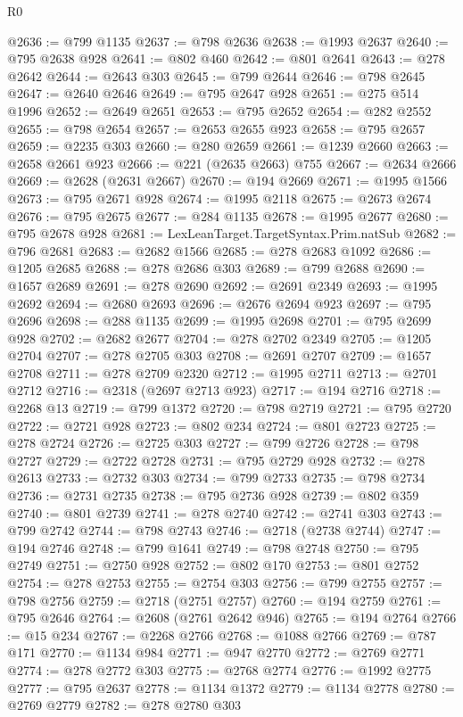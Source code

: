 \begin{lexlean}{R0}
\begin{coremodule}
@2636 := @799 @1135
@2637 := @798 @2636
@2638 := @1993 @2637
@2640 := @795 @2638 @928
@2641 := @802 @460
@2642 := @801 @2641
@2643 := @278 @2642
@2644 := @2643 @303
@2645 := @799 @2644
@2646 := @798 @2645
@2647 := @2640 @2646
@2649 := @795 @2647 @928
@2651 := @275 @514 @1996
@2652 := @2649 @2651
@2653 := @795 @2652
@2654 := @282 @2552
@2655 := @798 @2654
@2657 := @2653 @2655 @923
@2658 := @795 @2657
@2659 := @2235 @303
@2660 := @280 @2659
@2661 := @1239 @2660
@2663 := @2658 @2661 @923
@2666 := @221 (@2635 @2663) @755
@2667 := @2634 @2666
@2669 := @2628 (@2631 @2667)
@2670 := @194 @2669
@2671 := @1995 @1566
@2673 := @795 @2671 @928
@2674 := @1995 @2118
@2675 := @2673 @2674
@2676 := @795 @2675
@2677 := @284 @1135
@2678 := @1995 @2677
@2680 := @795 @2678 @928
@2681 := LexLeanTarget.TargetSyntax.Prim.natSub
@2682 := @796 @2681
@2683 := @2682 @1566
@2685 := @278 @2683 @1092
@2686 := @1205 @2685
@2688 := @278 @2686 @303
@2689 := @799 @2688
@2690 := @1657 @2689
@2691 := @278 @2690
@2692 := @2691 @2349
@2693 := @1995 @2692
@2694 := @2680 @2693
@2696 := @2676 @2694 @923
@2697 := @795 @2696
@2698 := @288 @1135
@2699 := @1995 @2698
@2701 := @795 @2699 @928
@2702 := @2682 @2677
@2704 := @278 @2702 @2349
@2705 := @1205 @2704
@2707 := @278 @2705 @303
@2708 := @2691 @2707
@2709 := @1657 @2708
@2711 := @278 @2709 @2320
@2712 := @1995 @2711
@2713 := @2701 @2712
@2716 := @2318 (@2697 @2713 @923)
@2717 := @194 @2716
@2718 := @2268 @13
@2719 := @799 @1372
@2720 := @798 @2719
@2721 := @795 @2720
@2722 := @2721 @928
@2723 := @802 @234
@2724 := @801 @2723
@2725 := @278 @2724
@2726 := @2725 @303
@2727 := @799 @2726
@2728 := @798 @2727
@2729 := @2722 @2728
@2731 := @795 @2729 @928
@2732 := @278 @2613
@2733 := @2732 @303
@2734 := @799 @2733
@2735 := @798 @2734
@2736 := @2731 @2735
@2738 := @795 @2736 @928
@2739 := @802 @359
@2740 := @801 @2739
@2741 := @278 @2740
@2742 := @2741 @303
@2743 := @799 @2742
@2744 := @798 @2743
@2746 := @2718 (@2738 @2744)
@2747 := @194 @2746
@2748 := @799 @1641
@2749 := @798 @2748
@2750 := @795 @2749
@2751 := @2750 @928
@2752 := @802 @170
@2753 := @801 @2752
@2754 := @278 @2753
@2755 := @2754 @303
@2756 := @799 @2755
@2757 := @798 @2756
@2759 := @2718 (@2751 @2757)
@2760 := @194 @2759
@2761 := @795 @2646
@2764 := @2608 (@2761 @2642 @946)
@2765 := @194 @2764
@2766 := @15 @234
@2767 := @2268 @2766
@2768 := @1088 @2766
@2769 := @787 @171
@2770 := @1134 @984
@2771 := @947 @2770
@2772 := @2769 @2771
@2774 := @278 @2772 @303
@2775 := @2768 @2774
@2776 := @1992 @2775
@2777 := @795 @2637
@2778 := @1134 @1372
@2779 := @1134 @2778
@2780 := @2769 @2779
@2782 := @278 @2780 @303

\end{coremodule}
\end{lexlean}
